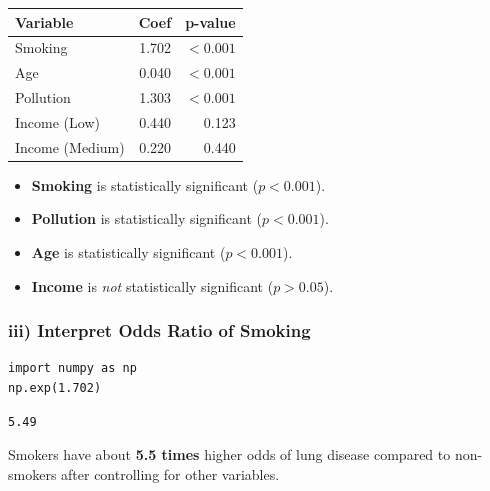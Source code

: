 \documentclass[12pt,a4paper]{article}
\begin{document}
\begin{outputbox}
\begin{center}
\begin{tabular}{lrr}
\toprule
\textbf{Variable} & \textbf{Coef} & \textbf{p-value} \\
\midrule
Smoking            & 1.702  & $<0.001$ \\
Age                & 0.040  & $<0.001$ \\
Pollution          & 1.303  & $<0.001$ \\
Income (Low)       & 0.440  & 0.123    \\
Income (Medium)    & 0.220  & 0.440    \\
\bottomrule
\end{tabular}
\end{center}
\end{outputbox}

\begin{interpbox}
\begin{itemize}[noitemsep]
  \item \textbf{Smoking} is statistically significant ($p < 0.001$).
  \item \textbf{Pollution} is statistically significant ($p < 0.001$).
  \item \textbf{Age} is statistically significant ($p < 0.001$).
  \item \textbf{Income} is \emph{not} statistically significant ($p > 0.05$).
\end{itemize}
\end{interpbox}

\subsubsection{iii) Interpret Odds Ratio of Smoking}

\begin{lstlisting}
import numpy as np
np.exp(1.702)
\end{lstlisting}

\begin{outputbox}
\begin{verbatim}
5.49
\end{verbatim}
\end{outputbox}

\begin{interpbox}
Smokers have about \textbf{5.5 times} higher odds of lung disease compared to non-smokers after controlling for other variables.
\end{interpbox}
\end{document}
